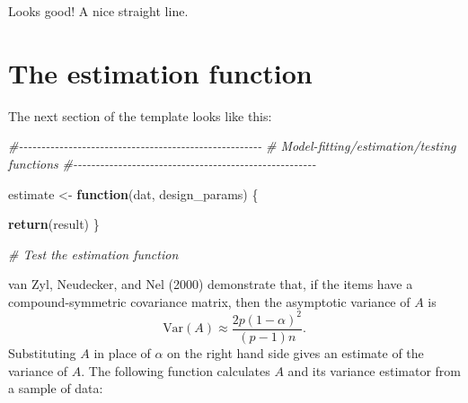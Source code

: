\documentclass[
]{book}
\newenvironment{Shaded}{\begin{snugshade}}{\end{snugshade}}
\newcommand{\CommentTok}[1]{\textcolor[rgb]{0.56,0.35,0.01}{\textit{#1}}}
\newcommand{\ControlFlowTok}[1]{\textcolor[rgb]{0.13,0.29,0.53}{\textbf{#1}}}
\newcommand{\FunctionTok}[1]{\textcolor[rgb]{0.13,0.29,0.53}{\textbf{#1}}}
\newcommand{\NormalTok}[1]{#1}
\newcommand{\OtherTok}[1]{\textcolor[rgb]{0.56,0.35,0.01}{#1}}
\begin{document}
Looks good! A nice straight line.

\section{The estimation function}\label{the-estimation-function}

The next section of the template looks like this:

\begin{Shaded}
\begin{Highlighting}[]
\CommentTok{\#{-}{-}{-}{-}{-}{-}{-}{-}{-}{-}{-}{-}{-}{-}{-}{-}{-}{-}{-}{-}{-}{-}{-}{-}{-}{-}{-}{-}{-}{-}{-}{-}{-}{-}{-}{-}{-}{-}{-}{-}{-}{-}{-}{-}{-}{-}{-}{-}{-}{-}{-}{-}{-}{-}}
\CommentTok{\# Model{-}fitting/estimation/testing functions}
\CommentTok{\#{-}{-}{-}{-}{-}{-}{-}{-}{-}{-}{-}{-}{-}{-}{-}{-}{-}{-}{-}{-}{-}{-}{-}{-}{-}{-}{-}{-}{-}{-}{-}{-}{-}{-}{-}{-}{-}{-}{-}{-}{-}{-}{-}{-}{-}{-}{-}{-}{-}{-}{-}{-}{-}{-}}

\NormalTok{estimate }\OtherTok{\textless{}{-}} \ControlFlowTok{function}\NormalTok{(dat, design\_params) \{}

  \FunctionTok{return}\NormalTok{(result)}
\NormalTok{\}}

\CommentTok{\# Test the estimation function}
\end{Highlighting}
\end{Shaded}

van Zyl, Neudecker, and Nel (2000) demonstrate that, if the items have a compound-symmetric covariance matrix, then the asymptotic variance of \(A\) is
\[
\text{Var}(A) \approx \frac{2p(1 - \alpha)^2}{(p - 1) n}.
\]
Substituting \(A\) in place of \(\alpha\) on the right hand side gives an estimate of the variance of \(A\). The following function calculates \(A\) and its variance estimator from a sample of data:
\end{document}

